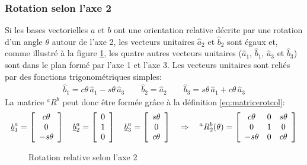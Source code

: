\subsubsection{Rotation selon l'axe 2}
%
Si les bases vectorielles $a$ et $b$ ont une orientation relative décrite par une rotation d'un angle $\theta$ autour de l'axe 2, les vecteurs unitaires $\hat{a}_2$ et $\hat{b}_2$ sont égaux et, comme illustré à la figure \ref{fig:r2vv}, les quatre autres vecteurs unitaires ($\hat{a}_1$, $\hat{b}_1$, $\hat{a}_3$ et $\hat{b}_3$) sont dans le plan formé par l'axe 1 et l'axe 3. Les vecteurs unitaires sont reliés par des fonctions trigonométriques simples: 
\begin{align}
\hat{b}_1 = c\theta \, \hat{a}_1 -s\theta \, \hat{a}_3 \quad\quad
\hat{b}_2 = \hat{a}_2 \quad\quad
\hat{b}_3 = s\theta \, \hat{a}_1 + c\theta \, \hat{a}_3
\label{eq:rot2vecuni}
\end{align}
La matrice $^aR^b$ peut donc être formée grâce à la définition \eqref{eq:matricerotcol}:
\begin{align}
\underline{b}_1^a = \left[ \begin{array}{c} c\theta \\ 0 \\ -s\theta  \end{array} \right] \quad
\underline{b}_2^a = \left[ \begin{array}{c} 0 \\ 1 \\ 0  \end{array} \right] \quad
\underline{b}_3^a = \left[ \begin{array}{c} s\theta \\ 0 \\ c\theta  \end{array} \right]
\quad \Rightarrow \quad
^aR^b_2(\theta) = \left[ \begin{array}{c c c}
	c\theta  & 0 & s\theta \\
	0        & 1 & 0 \\
	-s\theta & 0 & c\theta 
\end{array}  \right]
\label{eq:rot2theta}
\end{align}
%
\begin{figure}[H]
        \centering
				\hspace{+20pt}
        \caption{Rotation relative selon l'axe 2}
				\label{fig:r2vv}
\end{figure}
%


